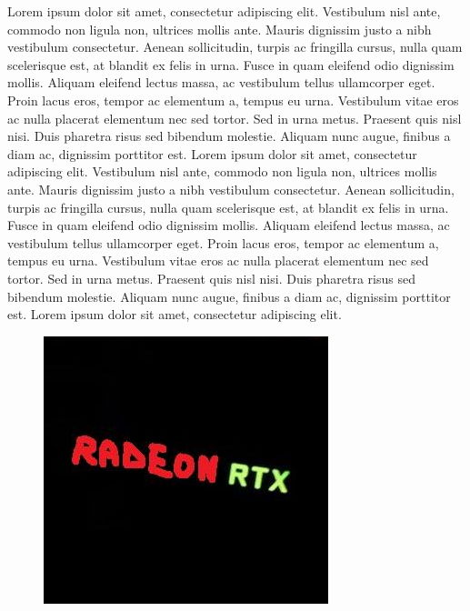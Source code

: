 Lorem ipsum dolor sit amet, consectetur adipiscing elit. Vestibulum nisl ante, commodo non ligula non, ultrices mollis ante. Mauris dignissim justo a nibh vestibulum consectetur. Aenean sollicitudin, turpis ac fringilla cursus, nulla quam scelerisque est, at blandit ex felis in urna. Fusce in quam eleifend odio dignissim mollis. Aliquam eleifend lectus massa, ac vestibulum tellus ullamcorper eget. Proin lacus eros, tempor ac elementum a, tempus eu urna. Vestibulum vitae eros ac nulla placerat elementum nec sed tortor. Sed in urna metus. Praesent quis nisl nisi. Duis pharetra risus sed bibendum molestie. Aliquam nunc augue, finibus a diam ac, dignissim porttitor est.
Lorem ipsum dolor sit amet, consectetur adipiscing elit. Vestibulum nisl ante, commodo non ligula non, ultrices mollis ante. Mauris dignissim justo a nibh vestibulum consectetur. Aenean sollicitudin, turpis ac fringilla cursus, nulla quam scelerisque est, at blandit ex felis in urna. Fusce in quam eleifend odio dignissim mollis. Aliquam eleifend lectus massa, ac vestibulum tellus ullamcorper eget. Proin lacus eros, tempor ac elementum a, tempus eu urna. Vestibulum vitae eros ac nulla placerat elementum nec sed tortor. Sed in urna metus. Praesent quis nisl nisi. Duis pharetra risus sed bibendum molestie. Aliquam nunc augue, finibus a diam ac, dignissim porttitor est.
Lorem ipsum dolor sit amet, consectetur adipiscing elit. 
\begin{figure}[bhp]
\includegraphics[width=\columnwidth]{images/radeonrtx}
\end{figure}
